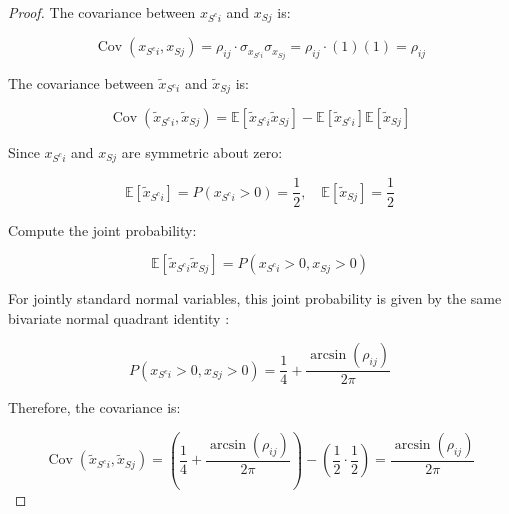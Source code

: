 \begin{proof}
The covariance between $ x_{{S^c}i} $ and $ x_{Sj} $ is:

\begin{equation}\label{eq:app-lemma3-raw-covariance}
\operatorname{Cov}(x_{{S^c}i}, x_{Sj}) = \rho_{ij} \cdot \sigma_{x_{{S^c}i}} \sigma_{x_{Sj}} = \rho_{ij} \cdot (1)(1) = \rho_{ij}
\end{equation}

The covariance between $ \tilde{x}_{{S^c}i} $ and $ \tilde{x}_{Sj} $ is:

\begin{equation}\label{eq:app-lemma3-binarized-covariance-definition}
\operatorname{Cov}(\tilde{x}_{{S^c}i}, \tilde{x}_{Sj}) = \mathbb{E}[\tilde{x}_{{S^c}i} \tilde{x}_{Sj}] - \mathbb{E}[\tilde{x}_{{S^c}i}] \mathbb{E}[\tilde{x}_{Sj}]
\end{equation}

Since $ x_{{S^c}i} $ and $ x_{Sj} $ are symmetric about zero:

\begin{equation}\label{eq:app-lemma3-binarized-means}
\mathbb{E}[\tilde{x}_{{S^c}i}] = P(x_{{S^c}i} > 0) = \frac{1}{2}, \quad \mathbb{E}[\tilde{x}_{Sj}] = \frac{1}{2}
\end{equation}

Compute the joint probability:

\begin{equation}\label{eq:app-lemma3-joint-expectation}
\mathbb{E}[\tilde{x}_{{S^c}i} \tilde{x}_{Sj}] = P(x_{{S^c}i} > 0, x_{Sj} > 0)
\end{equation}

For jointly standard normal variables, this joint probability is given by the same bivariate normal quadrant identity \cite{WFSheppard1899Application}:

\begin{equation}\label{eq:app-lemma3-joint-probability}
P(x_{{S^c}i} > 0, x_{Sj} > 0) = \frac{1}{4} + \frac{\arcsin(\rho_{ij})}{2\pi}
\end{equation}

Therefore, the covariance is:

\begin{equation}\label{eq:app-lemma3-binarized-covariance-result}
\operatorname{Cov}(\tilde{x}_{{S^c}i}, \tilde{x}_{Sj}) = \left( \frac{1}{4} + \frac{\arcsin(\rho_{ij})}{2\pi} \right) - \left( \frac{1}{2} \cdot \frac{1}{2} \right) = \frac{\arcsin(\rho_{ij})}{2\pi}
\end{equation}


\end{proof}
